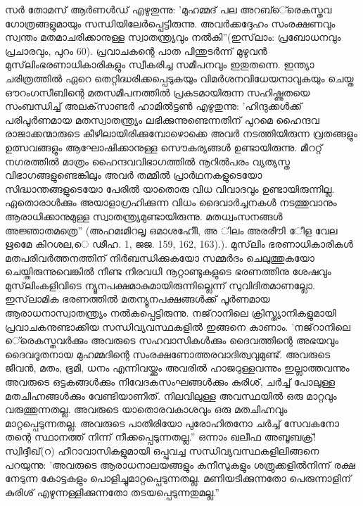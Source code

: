 സര്‍ തോമസ് ആര്‍ണള്‍ഡ് എഴുതുന്നു: 'മുഹമ്മദ് പല അറബ്‌െ്രെകസ്തവ ഗോത്രങ്ങളുമായും സന്ധിയിലേര്‍പ്പെട്ടിരുന്നു. അവര്‍ക്കദ്ദേഹം സംരക്ഷണവും സ്വന്തം മതമാചരിക്കാനുള്ള സ്വാതന്ത്യ്രവും നല്‍കി''(ഇസ്‌ലാം: പ്രബോധനവും പ്രചാരവും, പുറം 60).
പ്രവാചകന്റെ പാത പിന്തുടര്‍ന്ന് മുഴുവന്‍ മുസ്‌ലിംഭരണാധികാരികളും സ്വീകരിച്ച സമീപനവും ഇതുതന്നെ. ഇന്ത്യാ ചരിത്രത്തില്‍ ഏറെ തെറ്റിദ്ധരിക്കപ്പെടുകയും വിമര്‍ശനവിധേയനാവുകയും ചെയ്ത ഔറംഗസീബിന്റെ മതസമീപനത്തില്‍ പ്രകടമായിരുന്ന സഹിഷ്ണുതയെ സംബന്ധിച്ച് അലക്‌സാണ്ടര്‍ ഹാമില്‍ട്ടണ്‍ എഴുതുന്നു: 'ഹിന്ദുക്കള്‍ക്ക് പരിപൂര്‍ണമായ മതസ്വാതന്ത്യ്രം ലഭിക്കുന്നുണ്ടെന്നതിന് പുറമെ ഹൈന്ദവ രാജാക്കന്മാരുടെ കീഴിലായിരിക്കുമ്പോഴൊക്കെ അവര്‍ നടത്തിയിരുന്ന വ്രതങ്ങളും ഉത്സവങ്ങളും ആഘോഷിക്കാനുള്ള സൌകര്യങ്ങള്‍ ഉണ്ടായിരുന്നു. മീററ്റ് നഗരത്തില്‍ മാത്രം ഹൈന്ദവവിഭാഗത്തില്‍ നൂറില്‍പരം വ്യത്യസ്ത വിഭാഗങ്ങളുണ്ടെങ്കിലും അവര്‍ തമ്മില്‍ പ്രാര്‍ഥനകളുടെയോ സിദ്ധാന്തങ്ങളുടെയോ പേരില്‍ യാതൊരു വിധ വിവാദവും ഉണ്ടായിരുന്നില്ല. ഏതൊരാള്‍ക്കും അയാളാഗ്രഹിക്കുന്ന വിധം ദൈവാര്‍ച്ചനകള്‍ നടത്തുവാനും ആരാധിക്കാനുമുള്ള സ്വാതന്ത്യ്രമുണ്ടായിരുന്നു. മതധ്വംസനങ്ങള്‍ അജ്ഞാതമത്രെ'' (അഹമഃമിറലൃ ഒമാശഹീേി, അ ിലം അരരീൗി േീള വേല ഋമേെ കിറശല,െ ഢീഹ. 1, ജജ. 159, 162, 163).).
മുസ്‌ലിം ഭരണാധികാരികള്‍ മതപരിവര്‍ത്തനത്തിന് നിര്‍ബന്ധിക്കുകയോ സമ്മര്‍ദം ചെലുത്തുകയോ ചെയ്തിരുന്നുവെങ്കില്‍ നീണ്ട നിരവധി നൂറ്റാണ്ടുകളുടെ ഭരണത്തിനു ശേഷവും മുസ്‌ലിംകളിവിടെ ന്യൂനപക്ഷമാകുമായിരുന്നില്ലെന്ന് സുവിദിതമാണല്ലോ.
ഇസ്‌ലാമിക ഭരണത്തില്‍ മതന്യൂനപക്ഷങ്ങള്‍ക്ക് പൂര്‍ണമായ ആരാധനാസ്വാതന്ത്യ്രം നല്‍കപ്പെട്ടിരുന്നു. നജ്‌റാനിലെ ക്രിസ്ത്യാനികളുമായി പ്രവാചകനുണ്ടാക്കിയ സന്ധിവ്യവസ്ഥകളില്‍ ഇങ്ങനെ കാണാം. 'നജ്‌റാനിലെ െ്രെകസ്തവര്‍ക്കും അവരുടെ സഹവാസികള്‍ക്കും ദൈവത്തിന്റെ അഭയവും ദൈവദൂതനായ മുഹമ്മദിന്റെ സംരക്ഷണോത്തരവാദിത്വവുമുണ്ട്. അവരുടെ ജീവന്‍, മതം, ഭൂമി, ധനം എന്നിവയ്ക്കും അവരില്‍ ഹാജറുള്ളവന്നും ഇല്ലാത്തവന്നും അവരുടെ ഒട്ടകങ്ങള്‍ക്കും നിവേദകസംഘങ്ങള്‍ക്കും കുരിശ്, ചര്‍ച്ച് പോലുള്ള മതചിഹ്നങ്ങള്‍ക്കും വേണ്ടിയാണിത്. നിലവിലുള്ള അവസ്ഥയില്‍ ഒരു മാറ്റവും വരുത്തുന്നതല്ല. അവരുടെ യാതൊരവകാശവും ഒരു മതചിഹ്നവും മാറ്റപ്പെടുന്നതല്ല. അവരുടെ പാതിരിയോ പുരോഹിതനോ ചര്‍ച്ച് സേവകനോ തന്റെ സ്ഥാനത്ത് നിന്ന് നീക്കപ്പെടുന്നതല്ല.''
ഒന്നാം ഖലീഫ അബൂബക്ര്! സ്വിദ്ദീഖ്(റ) ഹീറാവാസികളുമായി ഒപ്പുവച്ച സന്ധിവ്യവസ്ഥകളിലിങ്ങനെ പറയുന്നു: 'അവരുടെ ആരാധനാലയങ്ങളും കനീസുകളും ശത്രുക്കളില്‍നിന്ന് രക്ഷ നേടുന്ന കോട്ടകളും പൊളിച്ചുമാറ്റപ്പെടുന്നതല്ല. മണിയടിക്കുന്നതോ പെരുന്നാളിന് കുരിശ് എഴുന്നള്ളിക്കുന്നതോ തടയപ്പെടുന്നതുമല്ല.''
